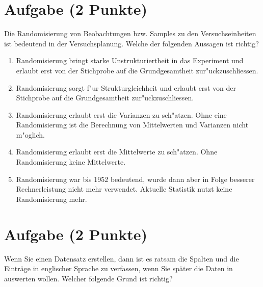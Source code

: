 \documentclass[a4paper, 9pt]{scrartcl}\usepackage[]{graphicx}\usepackage[]{xcolor}
\begin{document}
\section{Aufgabe \hfill (2 Punkte)}

Die Randomisierung von Beobachtungen bzw. Samples zu den Versuchseinheiten
ist bedeutend in der Versuchsplanung. Welche der folgenden Aussagen ist richtig?



\begin{enumerate}
\item [\textbf{A} \msquare] Randomisierung bringt starke Unstrukturiertheit in das Experiment und erlaubt erst von der Stichprobe auf die Grundgesamtheit zur{"u}ckzuschliessen.
\item [\textbf{B} \msquare] Randomisierung sorgt f{"u}r Strukturgleichheit und erlaubt erst von der Stichprobe auf die Grundgesamtheit zur{"u}ckzuschliessen.
\item [\textbf{C} \msquare] Randomisierung erlaubt erst die Varianzen zu sch{"a}tzen. Ohne eine Randomisierung ist die Berechnung von Mittelwerten und Varianzen nicht m{"o}glich.
\item [\textbf{D} \msquare] Randomisierung erlaubt erst die Mittelwerte zu sch{"a}tzen. Ohne Randomisierung keine Mittelwerte.
\item [\textbf{E} \msquare] Randomisierung war bis 1952 bedeutend, wurde dann aber in Folge besserer Rechnerleistung nicht mehr verwendet. Aktuelle Statistik nutzt keine Randomisierung mehr.
\end{enumerate}

\section{Aufgabe \hfill (2 Punkte)}

Wenn Sie einen Datensatz erstellen, dann ist es ratsam die Spalten und die
Eintr{\"a}ge in englischer Sprache zu verfassen, wenn Sie sp{\"a}ter die Daten in
\Rlogo auswerten wollen. Welcher folgende Grund ist richtig?
\end{document}
